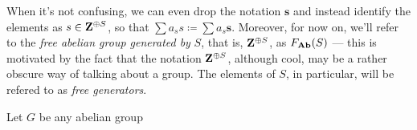 \begin{notation}
When it's not confusing, we can even drop the notation \(\mathbf{s}\) and
instead identify the elements as \(s \in \mathbf{Z}^{\oplus S}\), so that \(\sum a_s s
\coloneq \sum a_s \mathbf{s}\). Moreover, for now on, we'll refer to the
\emph{free abelian group generated by} \(S\), that is, \(\mathbf{Z}^{\oplus S}\), as
\(F_{{\textbf{Ab}}}(S)\) --- this is motivated by the fact that the notation \(\mathbf{Z}^{\oplus
S}\), although cool, may be a rather obscure way of talking about a group. The
elements of \(S\), in particular, will be refered to as \emph{free
generators}.
\end{notation}

\begin{proposition}
\label{prop:Ab-isomorphic-factor-of-free}
Let \(G\) be any abelian group
\end{proposition}


